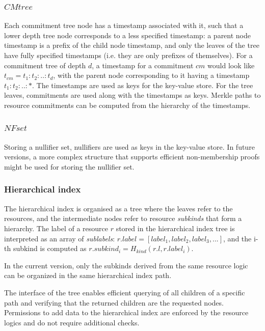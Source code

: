 \documentclass[
    11pt,            %
    techreport,        %
    affiltop,       %
]{art}
\begin{document}
\subsubsection{$CMtree$}

Each commitment tree node has a timestamp associated with it, such that a lower depth tree node corresponds to a less specified timestamp: a parent node timestamp is a prefix of the child node timestamp, and only the leaves of the tree have fully specified timestamps (i.e. they are only prefixes of themselves). For a commitment tree of depth $d$, a timestamp for a commitment $cm$ would look like $t_{cm} =t_1:t_2:..:t_d$, with the parent node corresponding to it having a timestamp $t_1:t_2:..:*$. The timestamps are used as keys for the key-value store. For the tree leaves, commitments are used along with the timestamps as keys. Merkle paths to resource commitments can be computed from the hierarchy of the timestamps.

\subsubsection{$NFset$}

Storing a nullifier set, nullifiers are used as keys in the key-value store. In future versions, a more complex structure that supports efficient non-membership proofs might be used for storing the nullifier set.

\subsubsection{Hierarchical index}
The hierarchical index is organised as a tree where the leaves refer to the resources, and the intermediate nodes refer to resource \textit{subkinds} that form a hierarchy. The label of a resource $r$ stored in the hierarchical index tree is interpreted as an array of \textit{sublabels}: $r.label = [label_1, label_2, label_3, ...]$, and the i-th subkind is computed as $r.subkind_i = H_{kind}(r.l, r.label_i)$.

\begin{remark}
    In the current version, only the subkinds derived from the same resource logic can be organized in the same hierarchical index path.
\end{remark}

The interface of the tree enables efficient querying of all children of a specific path and verifying that the returned children are the requested nodes. Permissions to add data to the hierarchical index are enforced by the resource logics and do not require additional checks.
\end{document}
